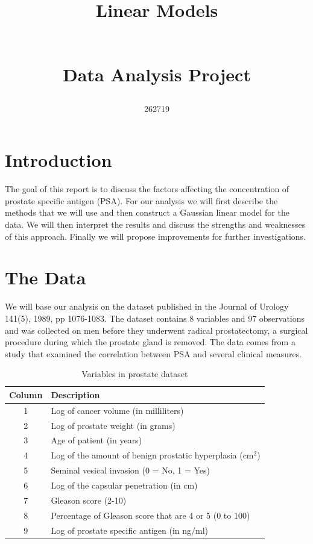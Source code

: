 \documentclass[10pt]{article}
\author{262719}
\title{\begin{huge}
Linear Models
\end{huge}\\Data Analysis Project}
\date{}
\begin{document}
\maketitle
 
\tableofcontents
\newpage

\section{Introduction}
\quad The goal of this report is to discuss the factors affecting the concentration of prostate specific antigen (PSA). For our analysis we will first describe the methods that we will use and then construct a Gaussian linear model for the data. We will then interpret the results and discuss the strengths and weaknesses of this approach. Finally we will propose improvements for further investigations.

\section{The Data}
\quad We will base our analysis on the dataset published in the Journal of Urology 141(5), 1989, pp 1076-1083. The dataset contains 8 variables and 97 observations and was collected on men before they underwent radical prostatectomy, a surgical procedure during which the prostate gland is removed. The data comes from a study that examined the correlation between PSA and several clinical measures. 

\begin{table}[ht]
\centering
\caption{Variables in prostate dataset} \label{datadescript}
\begin{tabular}{cl}
  \hline
 Column & Description \\ 
  \hline
1 & Log of cancer volume (in milliliters) \\
2 & Log of prostate weight (in grams)  \\
3 & Age of patient (in years)  \\
4 & Log of the amount of benign prostatic hyperplasia (cm${^2}$) \\
5 & Seminal vesical invasion (0 = No, 1 = Yes)  \\
6 & Log of the capsular penetration (in cm)  \\
7 & Gleason score (2-10)  \\
8 & Percentage of Gleason score that are 4 or 5 (0 to 100) \\ 
9 & Log of prostate specific antigen (in ng/ml) \\
   \hline
\end{tabular}
\end{table}
\end{document}
